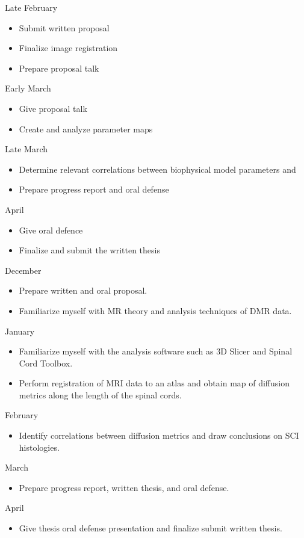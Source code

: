 Late February
\begin{itemize}
    \item Submit written proposal
    \item Finalize image registration
    \item Prepare proposal talk
\end{itemize}

Early March
\begin{itemize}
    \item Give proposal talk
    \item Create and analyze parameter maps
\end{itemize}

Late March
\begin{itemize}
    \item Determine relevant correlations between biophysical model parameters and \sci
    \item Prepare progress report and oral defense
\end{itemize}

April
\begin{itemize}
    \item Give oral defence
    \item Finalize and submit the written thesis
\end{itemize}


December
\begin{itemize}
    \item Prepare written and oral proposal.
    \item Familiarize myself with MR theory and analysis techniques of DMR data.
\end{itemize}

January
\begin{itemize}
    \item Familiarize myself with the analysis software such as 3D Slicer and Spinal Cord Toolbox.
    \item Perform registration of MRI data to an atlas and obtain map of diffusion metrics along the length of the spinal cords.
\end{itemize}

February
\begin{itemize}
    \item Identify correlations between diffusion metrics and draw conclusions on SCI histologies.
\end{itemize}

March
\begin{itemize}
    \item Prepare progress report, written thesis, and oral defense.
\end{itemize}

April
\begin{itemize}
    \item Give thesis oral defense presentation and finalize submit written thesis.
\end{itemize}
\fi
